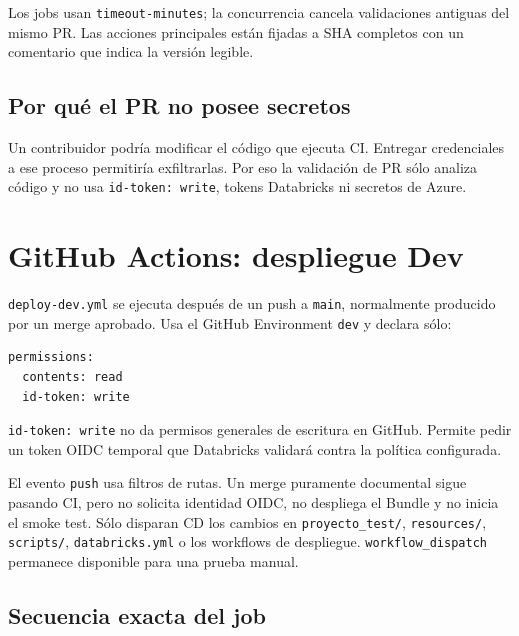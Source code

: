 \documentclass[11pt,a4paper]{article}
\begin{document}
Los jobs usan \texttt{timeout-minutes}; la concurrencia cancela validaciones antiguas del mismo PR.
Las acciones principales están fijadas a SHA completos con un comentario que indica la versión legible.

\subsection{Por qué el PR no posee secretos}

Un contribuidor podría modificar el código que ejecuta CI. Entregar credenciales a ese proceso
permitiría exfiltrarlas. Por eso la validación de PR sólo analiza código y no usa \texttt{id-token:
write}, tokens Databricks ni secretos de Azure.

\section{GitHub Actions: despliegue Dev}

\texttt{deploy-dev.yml} se ejecuta después de un push a \texttt{main}, normalmente producido por un
merge aprobado. Usa el GitHub Environment \texttt{dev} y declara sólo:

\begin{lstlisting}
permissions:
  contents: read
  id-token: write
\end{lstlisting}

\texttt{id-token: write} no da permisos generales de escritura en GitHub. Permite pedir un token OIDC
temporal que Databricks validará contra la política configurada.

El evento \texttt{push} usa filtros de rutas. Un merge puramente documental sigue pasando CI, pero no
solicita identidad OIDC, no despliega el Bundle y no inicia el smoke test. Sólo disparan CD los cambios
en \texttt{proyecto\_test/}, \texttt{resources/}, \texttt{scripts/}, \texttt{databricks.yml} o los
workflows de despliegue. \texttt{workflow\_dispatch} permanece disponible para una prueba manual.

\subsection{Secuencia exacta del job}
\end{document}
